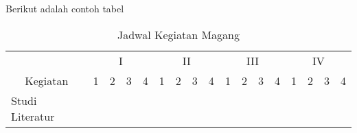 Berikut adalah contoh tabel
\begin{table}[h!]
	\centering
	\caption{Jadwal Kegiatan Magang}
	\label{tab:kegiatan}
	\begin{tabular}{|l|llll|llll|llll|llll|}
		\hline
		\multicolumn{1}{|c|}{}                           & \multicolumn{4}{c|}{I}                                                                                                                                                                        & \multicolumn{4}{c|}{II}                                                                                                                                                  & \multicolumn{4}{c|}{III}                                                                                                                                                 & \multicolumn{4}{c|}{IV}                                                                                                                                                  \\ \cline{2-17} 
		\multicolumn{1}{|c|}{\multirow{-2}{*}{Kegiatan}} & \multicolumn{1}{c|}{1}                        & \multicolumn{1}{c|}{2}                        & \multicolumn{1}{c|}{3}                        & \multicolumn{1}{c|}{4}                        & \multicolumn{1}{c|}{1}                        & \multicolumn{1}{c|}{2}                        & \multicolumn{1}{c|}{3}                        & \multicolumn{1}{c|}{4}   & \multicolumn{1}{c|}{1}                        & \multicolumn{1}{c|}{2}                        & \multicolumn{1}{c|}{3}                        & \multicolumn{1}{c|}{4}   & \multicolumn{1}{c|}{1}                        & \multicolumn{1}{c|}{2}                        & \multicolumn{1}{c|}{3}                        & \multicolumn{1}{c|}{4}   \\ \hline
		Studi Literatur                                  & \multicolumn{1}{c|}{\cellcolor[HTML]{9B9B9B}} & \multicolumn{1}{c|}{\cellcolor[HTML]{9B9B9B}} & \multicolumn{1}{c|}{}                         & \multicolumn{1}{c|}{}                         & \multicolumn{1}{c|}{}                         & \multicolumn{1}{c|}{}                         & \multicolumn{1}{c|}{}                         & \multicolumn{1}{c|}{}    & \multicolumn{1}{c|}{}                         & \multicolumn{1}{c|}{}                         & \multicolumn{1}{c|}{}                         & \multicolumn{1}{c|}{}    & \multicolumn{1}{c|}{}                         & \multicolumn{1}{c|}{}                         & \multicolumn{1}{c|}{}                         & \multicolumn{1}{c|}{}    \\ \hline

\end{tabular}
\end{table}
